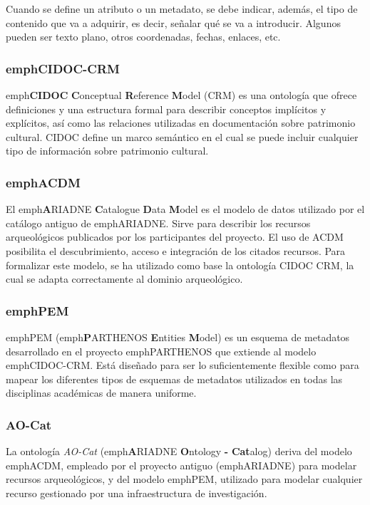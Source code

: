 Cuando se define un atributo o un metadato, se debe indicar, además, el
tipo de contenido que va a adquirir, es decir, señalar qué se va a
introducir. Algunos pueden ser texto plano, otros coordenadas, fechas,
enlaces, etc.

\subsubsection{emph{CIDOC-CRM}}

emph{\textbf{CIDOC} \textbf{C}onceptual \textbf{R}eference \textbf{M}odel}
(CRM) \cite{weboff:cidoc} es una
ontología que ofrece definiciones y una estructura formal para describir
conceptos implícitos y explícitos, así como las relaciones utilizadas en
documentación sobre patrimonio cultural. CIDOC define un marco semántico
en el cual se puede incluir cualquier tipo de información sobre
patrimonio cultural.

\subsubsection{emph{ACDM}}

El emph{\textbf{A}RIADNE \textbf{C}atalogue \textbf{D}ata \textbf{M}odel} es
el modelo de datos utilizado por el catálogo antiguo de emph{ARIADNE}. Sirve
para describir los recursos arqueológicos publicados por los
participantes del proyecto. El uso de ACDM posibilita el descubrimiento,
acceso e integración de los citados recursos. Para formalizar este
modelo, se ha utilizado como base la ontología CIDOC CRM, la cual se
adapta correctamente al dominio arqueológico.

\subsubsection{emph{PEM}}

emph{PEM} (emph{\textbf{P}ARTHENOS \textbf{E}ntities \textbf{M}odel}) es un esquema
de metadatos desarrollado en el proyecto emph{PARTHENOS} \cite{weboff:pem} que extiende al
modelo emph{CIDOC-CRM}. Está diseñado para ser lo suficientemente flexible
como para mapear los diferentes tipos de esquemas de metadatos
utilizados en todas las disciplinas académicas de manera uniforme.

\subsubsection{AO-Cat}

La ontología \emph{AO-Cat} (emph{\textbf{A}RIADNE \textbf{O}ntology
\textbf{-} \textbf{Cat}alog}) deriva del modelo emph{ACDM}, empleado
por el proyecto antiguo (emph{ARIADNE}) para modelar recursos arqueológicos, y
del modelo emph{PEM}, utilizado para modelar cualquier recurso gestionado por
una infraestructura de investigación. 

